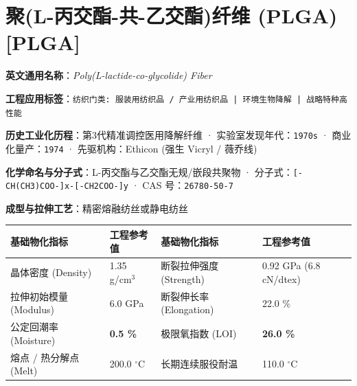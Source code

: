 \documentclass[11pt,openright,twoside,UTF8]{ctexbook}
\begin{document}
\section{聚(L-丙交酯-共-乙交酯)纤维 (PLGA) [PLGA]}
\label{sec:plga}

\noindent\textbf{英文通用名称}：\textit{Poly(L-lactide-co-glycolide) Fiber}\par
\noindent\textbf{工程应用标签}：\texttt{纺织门类: 服装用纺织品 / 产业用纺织品 | 环境生物降解 | 战略特种高性能}\par
\noindent\textbf{历史工业化历程}：第3代精准调控医用降解纤维 · 实验室发现年代：\texttt{1970s} · 商业化量产：\texttt{1974} · 先驱机构：Ethicon (强生 Vicryl / 薇乔线)\par
\noindent\textbf{化学命名与分子式}：L-丙交酯与乙交酯无规/嵌段共聚物 · 分子式：\texttt{[-CH(CH3)COO-]x-[-CH2COO-]y} · CAS 号：\texttt{26780-50-7}\par
\noindent\textbf{成型与拉伸工艺}：精密熔融纺丝或静电纺丝\par

\vspace{0.15cm}
\begin{center}
\small
\begin{tabularx}{\textwidth}{p{3.8cm}Xp{3.8cm}X}
\toprule
\textbf{基础物化指标} & \textbf{工程参考值} & \textbf{基础物化指标} & \textbf{工程参考值} \\
\midrule
晶体密度 (Density) & 1.35 g/cm$^3$ & 断裂拉伸强度 (Strength) & 0.92 GPa (6.8 cN/dtex) \\
拉伸初始模量 (Modulus) & 6.0 GPa & 断裂伸长率 (Elongation) & 22.0 \% \\
公定回潮率 (Moisture) & \textbf{0.5 \%} & 极限氧指数 (LOI) & \textbf{26.0 \%} \\
熔点 / 热分解点 (Melt) & 200.0 $^\circ\mathrm{C}$ & 长期连续服役耐温 & 110.0 $^\circ\mathrm{C}$ \\
\bottomrule
\end{tabularx}
\end{center}
\vspace{0.15cm}
\end{document}
